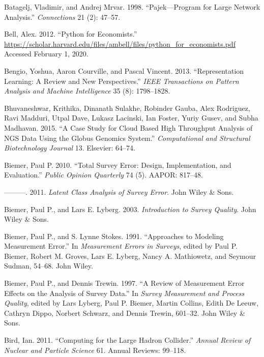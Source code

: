 \documentclass[]{krantz}
\begin{document}
\hypertarget{ref-batagelj1998pajek}{}
Batagelj, Vladimir, and Andrej Mrvar. 1998. ``Pajek---Program for Large
Network Analysis.'' \emph{Connections} 21 (2): 47--57.

\hypertarget{ref-BellPython}{}
Bell, Alex. 2012. ``Python for Economists.''
\url{https://scholar.harvard.edu/files/ambell/files/python_for_economists.pdf}
Accessed February 1, 2020.

\hypertarget{ref-bengio-13}{}
Bengio, Yoshua, Aaron Courville, and Pascal Vincent. 2013.
``Representation Learning: A Review and New Perspectives.'' \emph{IEEE
Transactions on Pattern Analysis and Machine Intelligence} 35 (8):
1798--1828.

\hypertarget{ref-bhuvaneshwar2015case}{}
Bhuvaneshwar, Krithika, Dinanath Sulakhe, Robinder Gauba, Alex
Rodriguez, Ravi Madduri, Utpal Dave, Lukasz Lacinski, Ian Foster, Yuriy
Gusev, and Subha Madhavan. 2015. ``A Case Study for Cloud Based High
Throughput Analysis of NGS Data Using the Globus Genomics System.''
\emph{Computational and Structural Biotechnology Journal} 13. Elsevier:
64--74.

\hypertarget{ref-biemer2010total}{}
Biemer, Paul P. 2010. ``Total Survey Error: Design, Implementation, and
Evaluation.'' \emph{Public Opinion Quarterly} 74 (5). AAPOR: 817--48.

\hypertarget{ref-biemer2011latent}{}
---------. 2011. \emph{Latent Class Analysis of Survey Error}. John
Wiley \& Sons.

\hypertarget{ref-biemer2003}{}
Biemer, Paul P., and Lars E. Lyberg. 2003. \emph{Introduction to Survey
Quality}. John Wiley \& Sons.

\hypertarget{ref-BiemerStokes1991}{}
Biemer, Paul P., and S. Lynne Stokes. 1991. ``Approaches to Modeling
Measurement Error.'' In \emph{Measurement Errors in Surveys}, edited by
Paul P. Biemer, Robert M. Groves, Lars E. Lyberg, Nancy A. Mathiowetz,
and Seymour Sudman, 54--68. John Wiley.

\hypertarget{ref-biemer1997review}{}
Biemer, Paul P., and Dennis Trewin. 1997. ``A Review of Measurement
Error Effects on the Analysis of Survey Data.'' In \emph{Survey
Measurement and Process Quality}, edited by Lars Lyberg, Paul P. Biemer,
Martin Collins, Edith De Leeuw, Cathryn Dippo, Norbert Schwarz, and
Dennis Trewin, 601--32. John Wiley \& Sons.

\hypertarget{ref-bird2011computing}{}
Bird, Ian. 2011. ``Computing for the Large Hadron Collider.''
\emph{Annual Review of Nuclear and Particle Science} 61. Annual Reviews:
99--118.
\end{document}
